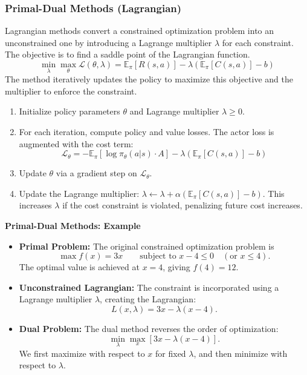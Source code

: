 \documentclass[12pt]{article}
\begin{document}
\subsubsection{Primal-Dual Methods (Lagrangian)}
Lagrangian methods convert a constrained optimization problem into an unconstrained one by introducing a Lagrange multiplier $\lambda$ for each constraint. The objective is to find a saddle point of the Lagrangian function.
$$ \min_\lambda \max_\theta \mathcal{L}(\theta, \lambda) = \mathbb{E}_\pi [R(s, a)] - \lambda \left( \mathbb{E}_\pi [C(s, a)] - b \right) $$
The method iteratively updates the policy to maximize this objective and the multiplier to enforce the constraint.
\begin{enumerate}
    \item Initialize policy parameters $\theta$ and Lagrange multiplier $\lambda \ge 0$.
    \item For each iteration, compute policy and value losses. The actor loss is augmented with the cost term:
    $$ \mathcal{L}_\theta = - \mathbb{E}_\pi [\log \pi_\theta(a|s) \cdot A] - \lambda \left( \mathbb{E}_\pi [C(s, a)] - b \right) $$
    \item Update $\theta$ via a gradient step on $\mathcal{L}_\theta$.
    \item Update the Lagrange multiplier: $\lambda \leftarrow \lambda + \alpha \left( \mathbb{E}_\pi [C(s, a)] - b \right)$. This increases $\lambda$ if the cost constraint is violated, penalizing future cost increases.
\end{enumerate}

\textbf{Primal-Dual Methods: Example}

\begin{itemize}
    \item \textbf{Primal Problem:}  
    The original constrained optimization problem is
    $$
    \max f(x) = 3x \qquad \text{subject to } x - 4 \leq 0 \quad (\text{or } x \leq 4).
    $$
    The optimal value is achieved at $x=4$, giving $f(4) = 12$.

    \item \textbf{Unconstrained Lagrangian:}  
    The constraint is incorporated using a Lagrange multiplier $\lambda$, creating the Lagrangian:
    $$
    L(x, \lambda) = 3x - \lambda(x - 4).
    $$

    \item \textbf{Dual Problem:}  
    The dual method reverses the order of optimization:
    $$
    \min_{\lambda} \max_{x} \left[ 3x - \lambda(x - 4) \right].
    $$
    We first maximize with respect to $x$ for fixed $\lambda$, and then minimize with respect to $\lambda$.
\end{itemize}
\end{document}

